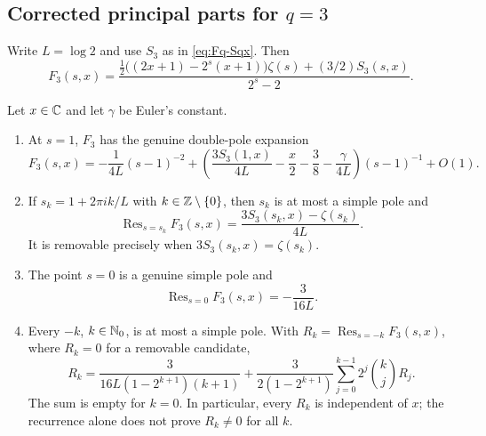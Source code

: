 \subsection{Corrected principal parts for \texorpdfstring{$q=3$}{q=3}}

Write $L=\log 2$ and use $S_3$ as in \cref{eq:Fq-Sqx}.  Then
\begin{equation}
 \label{eq:F3-corrected-continuation}
 F_3(s,x)=\frac{
 \frac12\bigl((2x+1)-2^s(x+1)\bigr)\zeta(s)
 +(3/2)S_3(s,x)}{2^s-2}.
\end{equation}

\begin{proposition}[the corrected $q=3$ principal parts]
\label{prop:F3-corrected-principal-parts}
Let $x\in\mathbb C$ and let $\gamma$ be Euler's constant.
\begin{enumerate}[label=\textup{(\roman*)}]
\item At $s=1$, $F_3$ has the genuine double-pole expansion
\begin{equation}
 \label{eq:F3-principal-part-one}
 F_3(s,x)=-\frac1{4L}(s-1)^{-2}
 +\left(
   \frac{3S_3(1,x)}{4L}-\frac x2-\frac38-\frac{\gamma}{4L}
  \right)(s-1)^{-1}+O(1).
\end{equation}
\item If $s_k=1+2\pi ik/L$ with $k\in\mathbb Z\setminus\{0\}$, then
$s_k$ is at most a simple pole and
\begin{equation}
 \label{eq:F3-nonreal-lattice-residue}
 \operatorname{Res}_{s=s_k}F_3(s,x)
 =\frac{3S_3(s_k,x)-\zeta(s_k)}{4L}.
\end{equation}
It is removable precisely when $3S_3(s_k,x)=\zeta(s_k)$.
\item The point $s=0$ is a genuine simple pole and
\begin{equation}
 \label{eq:F3-zero-residue}
 \operatorname{Res}_{s=0}F_3(s,x)=-\frac3{16L}.
\end{equation}
\item Every $-k$, $k\in\mathbb N_0$, is at most a simple pole.  With
$R_k=\operatorname{Res}_{s=-k}F_3(s,x)$, where $R_k=0$ for a removable
candidate,
\begin{equation}
 \label{eq:F3-negative-residue-recurrence}
 R_k=\frac{3}{16L(1-2^{k+1})(k+1)}
 +\frac{3}{2(1-2^{k+1})}
  \sum_{j=0}^{k-1}2^j\binom{k}{j}R_j.
\end{equation}
The sum is empty for $k=0$.  In particular, every $R_k$ is independent
of $x$; the recurrence alone does not prove $R_k\ne0$ for all $k$.
\end{enumerate}
\end{proposition}


